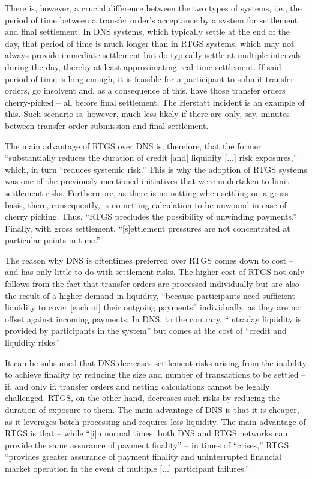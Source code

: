 There is, however, a crucial difference between the two types of systems, i.e., the period of time between a transfer order's acceptance by a system for settlement and final settlement.
In DNS systems, which typically settle at the end of the day, that period of time is much longer than in RTGS systems, which may not always provide immediate settlement but do typically settle at multiple intervals during the day, thereby at least approximating real-time settlement.
If said period of time is long enough, it is feasible for a participant to submit transfer orders, go insolvent and, as a consequence of this, have those transfer orders cherry-picked -- all before final settlement.
The Herstatt incident is an example of this.
Such scenario is, however, much less likely if there are only, say, minutes between transfer order submission and final settlement.

The main advantage of RTGS over DNS is, therefore, that the former ``substantially reduces the duration of credit [and] liquidity [...] risk exposures,'' which, in turn ``reduces systemic risk.''
\autocite[43]{vereecken2003}
This is why the adoption of RTGS systems was one of the previously mentioned initiatives  that were undertaken to limit settlement risks.
Furthermore, as there is no netting when settling on a gross basis, there, consequently, is no netting calculation to be unwound in case of cherry picking.
Thus, ``RTGS precludes the possibility of unwinding payments.'' \autocite[43]{vereecken2003}
Finally, with gross settlement, ``[s]ettlement pressures are not concentrated at particular points in time.'' \autocite[43]{vereecken2003}

The reason why DNS is oftentimes preferred over RTGS comes down to cost -- and has only little to do with settlement risks.
The higher cost of RTGS not only follows from the fact that transfer orders are processed individually but are also the result of a higher demand in liquidity, ``because participants need sufficient liquidity to cover [each of] their outgoing payments'' \autocite[26]{cpmi2001} individually, as they are not offset against incoming payments.
In DNS, to the contrary, ``intraday liquidity is provided by participants in the system'' but comes at the cost of ``credit and liquidity risks.'' \autocite[26]{cpmi2001}

It can be subsumed that DNS decreases settlement risks arising from the inability to achieve finality by reducing the size and number of transactions to be settled -- if, and only if, transfer orders and netting calculations cannot be legally challenged.
RTGS, on the other hand, decreases such risks by reducing the duration of exposure to them.
The main advantage of DNS is that it is cheaper, as it leverages batch processing and requires less liquidity.
The main advantage of RTGS is that -- while ``[i]n normal times, both DNS and RTGS networks can provide the same assurance of payment finality'' -- in times of ``crises,'' RTGS ``provides greater assurance of payment finality and uninterrupted financial market operation in the event of multiple [...] participant failures.'' \autocite[5]{pages2005}

